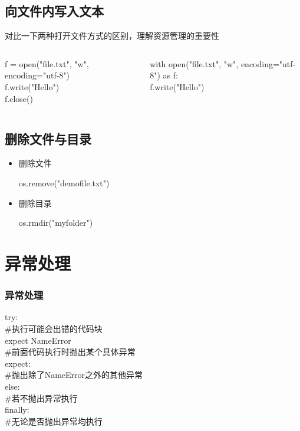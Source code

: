\documentclass{beamer}
\begin{document}
\subsection{向文件内写入文本}
\begin{frame}[t]
	对比一下两种打开文件方式的区别，理解资源管理的重要性
	\begin{columns}
		\begin{column}{0.5\textwidth}
			f = open("file.txt", "w", encoding="utf-8")\\
			f.write("Hello")\\
			f.close()
		\end{column}
		\pause
		\begin{column}{0.5\textwidth}
			with open("file.txt", "w", encoding="utf-8") as f:\\
			f.write("Hello")
		\end{column}
	\end{columns}

\end{frame}
\subsection{删除文件与目录}
\begin{itemize}
	\item 删除文件
	      \begin{example}[]
		      os.remove("demofile.txt")
	      \end{example}
	\item 删除目录
	      \begin{example}[]
		      os.rmdir("myfolder")
	      \end{example}
\end{itemize}

\section{异常处理}

\begin{frame}[t]
	\frametitle{异常处理}
	try:\\\#执行可能会出错的代码块\\
	expect NameError\\\#前面代码执行时抛出某个具体异常\\
	expect:\\\#抛出除了NameError之外的其他异常\\
	else:\\\#若不抛出异常执行\\
	finally:\\\#无论是否抛出异常均执行


\end{frame}
\end{document}
